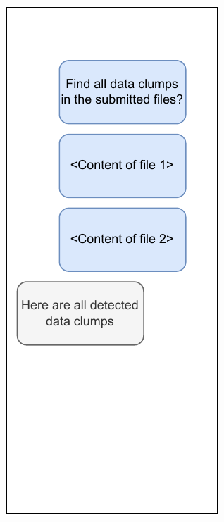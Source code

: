 {\begin{figure}
\centering
  \begin{adjustbox}{minipage=\linewidth,scale=0.7}
     \centering
     \begin{subfigure}[b]{0.3\textwidth}
         \centering
         \includegraphics[width=\textwidth]{figures/chapter2/chatgpt_stateless_1.drawio.pdf}

\end{subfigure}
\end{adjustbox}
\end{figure}}

